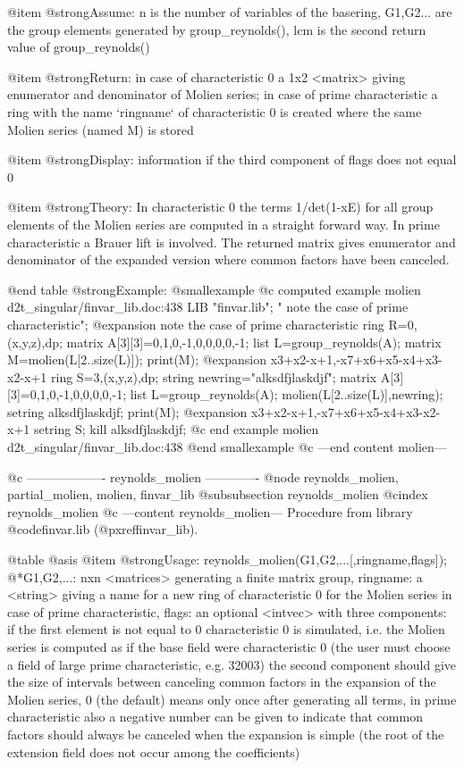 @item @strong{Assume:}
n is the number of variables of the basering, G1,G2... are the group
elements generated by group_reynolds(), lcm is the second return value
of group_reynolds()

@item @strong{Return:}
in case of characteristic 0 a 1x2 <matrix> giving enumerator and
denominator of Molien series; in case of prime characteristic a ring
with the name `ringname` of characteristic 0 is created where the same
Molien series (named M) is stored

@item @strong{Display:}
information if the third component of flags does not equal 0

@item @strong{Theory:}
In characteristic 0 the terms 1/det(1-xE) for all group elements of
the Molien series are computed in a straight forward way. In prime
characteristic a Brauer lift is involved. The returned matrix gives
enumerator and denominator of the expanded version where common
factors have been canceled.

@end table
@strong{Example:}
@smallexample
@c computed example molien d2t_singular/finvar_lib.doc:438 
LIB "finvar.lib";
"         note the case of prime characteristic"; 
@expansion{}          note the case of prime characteristic
ring R=0,(x,y,z),dp;
matrix A[3][3]=0,1,0,-1,0,0,0,0,-1;
list L=group_reynolds(A);
matrix M=molien(L[2..size(L)]);
print(M);
@expansion{} x3+x2-x+1,-x7+x6+x5-x4+x3-x2-x+1
ring S=3,(x,y,z),dp;
string newring="alksdfjlaskdjf";
matrix A[3][3]=0,1,0,-1,0,0,0,0,-1;
list L=group_reynolds(A);
molien(L[2..size(L)],newring);
setring alksdfjlaskdjf;
print(M);
@expansion{} x3+x2-x+1,-x7+x6+x5-x4+x3-x2-x+1
setring S;
kill alksdfjlaskdjf;
@c end example molien d2t_singular/finvar_lib.doc:438
@end smallexample
@c ---end content molien---

@c ------------------- reynolds_molien -------------
@node reynolds_molien, partial_molien, molien, finvar_lib
@subsubsection reynolds_molien
@cindex reynolds_molien
@c ---content reynolds_molien---
Procedure from library @code{finvar.lib} (@pxref{finvar_lib}).

@table @asis
@item @strong{Usage:}
reynolds_molien(G1,G2,...[,ringname,flags]);
@*G1,G2,...: nxn <matrices> generating a finite matrix group, ringname:
a <string> giving a name for a new ring of characteristic 0 for the
Molien series in case of prime characteristic, flags: an optional
<intvec> with three components: if the first element is not equal to 0
characteristic 0 is simulated, i.e. the Molien series is computed as
if the base field were characteristic 0 (the user must choose a field
of large prime characteristic, e.g. 32003) the second component should
give the size of intervals between canceling common factors in the
expansion of the Molien series, 0 (the default) means only once after
generating all terms, in prime characteristic also a negative number
can be given to indicate that common factors should always be canceled
when the expansion is simple (the root of the extension field does not
occur among the coefficients)

